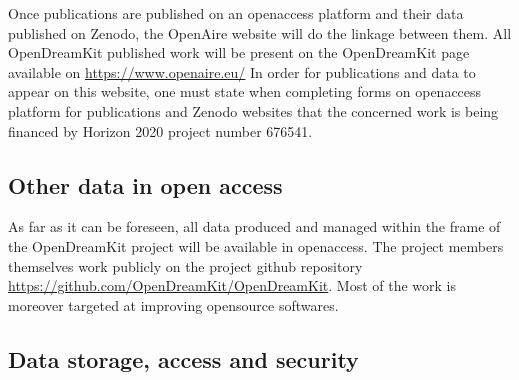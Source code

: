 \documentclass{../../Proposal/LaTeX-proposal/deliverablereport}
\begin{document}
Once publications are published on an openaccess platform and their data published on Zenodo, the OpenAire website will do the linkage between them. All OpenDreamKit published work will be present on the OpenDreamKit page available on \href{https://www.openaire.eu/}{https://www.openaire.eu/}
In order for publications and data to appear on this website, one must state when completing forms on openaccess platform for publications and Zenodo websites that the concerned work is being financed by Horizon 2020 project number 676541.



\subsection{Other data in open access}


As far as it can be foreseen, all data produced and managed within the frame of the OpenDreamKit project will be available in openaccess. The project members themselves work publicly on the project github repository \url{https://github.com/OpenDreamKit/OpenDreamKit}.
Most of the work is moreover targeted at improving opensource softwares.



\subsection{Data storage, access and security}
\end{document}
